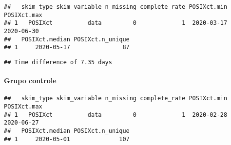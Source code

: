 \documentclass[
]{article}
\newenvironment{Shaded}{\begin{snugshade}}{\end{snugshade}}
\newcommand{\AttributeTok}[1]{\textcolor[rgb]{0.77,0.63,0.00}{#1}}
\newcommand{\FunctionTok}[1]{\textcolor[rgb]{0.00,0.00,0.00}{#1}}
\newcommand{\NormalTok}[1]{#1}
\newcommand{\SpecialCharTok}[1]{\textcolor[rgb]{0.00,0.00,0.00}{#1}}
\newcommand{\StringTok}[1]{\textcolor[rgb]{0.31,0.60,0.02}{#1}}
\begin{document}
\begin{verbatim}
##   skim_type skim_variable n_missing complete_rate POSIXct.min POSIXct.max
## 1   POSIXct          data         0             1  2020-03-17  2020-06-30
##   POSIXct.median POSIXct.n_unique
## 1     2020-05-17               87
\end{verbatim}

\begin{Shaded}
\end{Shaded}

\begin{verbatim}
## Time difference of 7.35 days
\end{verbatim}

\hypertarget{grupo-controle}{%
\paragraph{\texorpdfstring{\textbf{Grupo
controle}}{Grupo controle}}\label{grupo-controle}}

\begin{Shaded}
\end{Shaded}

\begin{verbatim}
##   skim_type skim_variable n_missing complete_rate POSIXct.min POSIXct.max
## 1   POSIXct          data         0             1  2020-02-28  2020-06-27
##   POSIXct.median POSIXct.n_unique
## 1     2020-05-01              107
\end{verbatim}

\begin{Shaded}
\end{Shaded}
\end{document}
